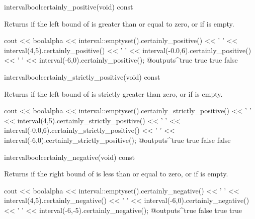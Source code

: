 \begin{defmethod}{interval}{bool}{certainly\_positive}{(void) const}
  \begin{operation}
  \end{operation}
  Returns  if the left bound of  is greater than or
  equal to zero, or if  is empty.
\begin{example}
cout << boolalpha << interval::emptyset().certainly_positive() << ' '
     << interval(4,5).certainly_positive() << ' '
     << interval(-0.0,6).certainly_positive() << ' '
     << interval(-6,0).certainly_positive();
@outputs^true true true false~
\end{example}
\end{defmethod}

\begin{defmethod}{interval}{bool}{certainly\_strictly\_positive}{(void) const}
  \begin{operation}
    \op{$\code{self}\subseteq\left]0,+\infty\right]$}
  \end{operation}
  Returns  if the left bound of  is strictly greater
  than zero, or if  is empty.
\begin{example}
cout << boolalpha
     << interval::emptyset().certainly_strictly_positive() << ' '
     << interval(4,5).certainly_strictly_positive() << ' '
     << interval(-0.0,6).certainly_strictly_positive() << ' '
     << interval(-6,0).certainly_strictly_positive();
@outputs^true true false false~
\end{example}
\end{defmethod}

\begin{defmethod}{interval}{bool}{certainly\_negative}{(void) const}
  \begin{operation}
  \end{operation}
  Returns  if the right bound of  is less than or
  equal to zero, or if  is empty.
\begin{example}
cout << boolalpha << interval::emptyset().certainly_negative() << ' '
     << interval(4,5).certainly_negative() << ' '
     << interval(-6,0).certainly_negative() << ' '
     << interval(-6,-5).certainly_negative();
@outputs^true false true true~
\end{example}
\end{defmethod}

